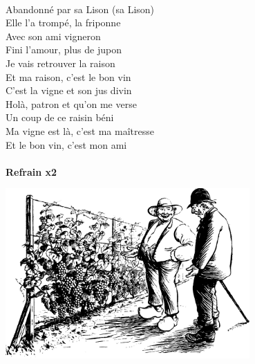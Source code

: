\\Abandonné par sa Lison (sa Lison)
\\Elle l'a trompé, la friponne
\\Avec son ami vigneron
\\Fini l'amour, plus de jupon
\\Je vais retrouver la raison
\\Et ma raison, c'est le bon vin
\\C'est la vigne et son jus divin
\\Holà, patron et qu'on me verse
\\Un coup de ce raisin béni
\\Ma vigne est là, c'est ma maîtresse
\\Et le bon vin, c'est mon ami
\\\\\textbf{Refrain x2}
\vspace{0.5cm}
\begin{center}
\includegraphics[width=0.7\textwidth]{images/brev5.png}
\end{center}
\breakpage